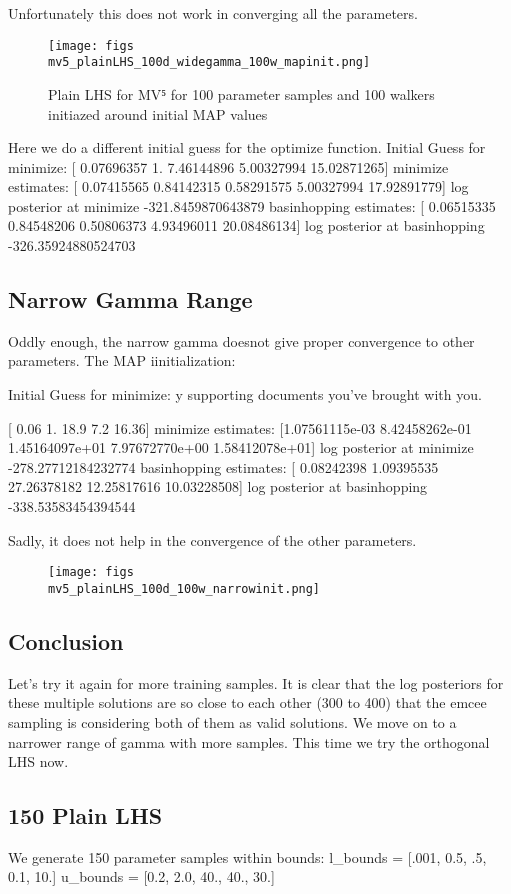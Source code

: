 \documentclass{article}
\begin{document}
Unfortunately this does not work in converging all the parameters. 

\begin{figure}
\centering
\texttt{[image: figs\\mv5\_plainLHS\_100d\_widegamma\_100w\_mapinit.png]}
\caption{Plain LHS for MV⁵ for 100 parameter samples and 100 walkers initiazed around initial MAP values}
\end{figure}


Here we do a different initial guess for the optimize function.
Initial Guess for minimize:  [ 0.07696357  1.          7.46144896  5.00327994 15.02871265]
minimize estimates:  [ 0.07415565  0.84142315  0.58291575  5.00327994 17.92891779]
log posterior at minimize -321.8459870643879
basinhopping estimates:  [ 0.06515335  0.84548206  0.50806373  4.93496011 20.08486134]
log posterior at basinhopping -326.35924880524703


\subsection{Narrow Gamma Range}

Oddly enough, the narrow gamma doesnot give proper convergence to other parameters. The MAP iinitialization:

Initial Guess for minimize:  y supporting documents you’ve brought with you.

[ 0.06  1.   18.9   7.2  16.36]
minimize estimates:  [1.07561115e-03 8.42458262e-01 1.45164097e+01 7.97672770e+00  1.58412078e+01]
log posterior at minimize -278.27712184232774
basinhopping estimates:  [ 0.08242398  1.09395535 27.26378182 12.25817616 10.03228508]
log posterior at basinhopping -338.53583454394544

Sadly, it does not help in the convergence of the other parameters.

\begin{figure}
\centering
\texttt{[image: figs\\mv5\_plainLHS\_100d\_100w\_narrowinit.png]}
\end{figure}

\subsection{Conclusion}
Let's try it again for more training samples. It is clear that the log posteriors for these multiple solutions are so close to each other (300 to 400) that the emcee sampling is considering both of them as valid solutions. We move on to a narrower range of gamma with more samples. This time we try the orthogonal LHS now. 

\subsection{150 Plain LHS}
We generate 150 parameter samples within bounds: 	
l_bounds = [.001, 0.5, .5, 0.1, 10.]
u_bounds = [0.2, 2.0, 40., 40., 30.]
\end{document}
